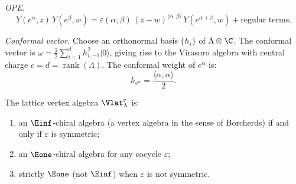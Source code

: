 \begin{construction}
\noindent\emph{OPE.}
\begin{equation}\label{eq:lattice:ope}
Y(e^\alpha, z)\, Y(e^\beta, w)
= \varepsilon(\alpha, \beta)\, (z-w)^{\langle\alpha,\beta\rangle}\,
 Y(e^{\alpha+\beta}, w) + \text{regular terms}.
\end{equation}

\noindent\emph{Conformal vector.}
Choose an orthonormal basis $\{h_i\}$ of $\Lambda \otimes \C$.
The conformal vector is
$\omega = \frac{1}{2}\sum_{i=1}^d h_{i,{-1}}^2 |0\rangle$,
giving rise to the Virasoro algebra with central charge $c = d = \operatorname{rank}(\Lambda)$.
The conformal weight of $e^\alpha$ is:
\begin{equation}\label{eq:lattice:conformal-weight}
h_{e^\alpha} = \frac{\langle\alpha,\alpha\rangle}{2}.
\end{equation}
\end{construction}

\begin{theorem}
\label{thm:lattice:e1-vs-einf}
The lattice vertex algebra $\Vlat_\Lambda^\varepsilon$ is:
\begin{enumerate}[label=(\roman*)]
\item an $\Einf$-chiral algebra (a vertex algebra in the sense of
 Borcherds) if and only if $\varepsilon$ is symmetric;
\item an $\Eone$-chiral algebra for any cocycle $\varepsilon$;
\item strictly $\Eone$ (not $\Einf$) when $\varepsilon$ is not symmetric.
\end{enumerate}
\end{theorem}

